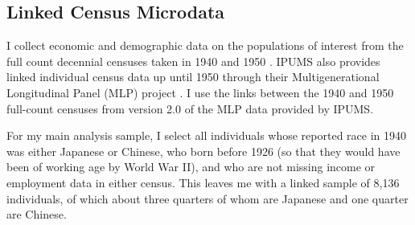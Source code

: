 \documentclass[12pt]{article}
\begin{document}
\subsection{Linked Census Microdata}
\label{sec:orga466988}

I collect economic and demographic data on the populations of interest
from the full count decennial censuses taken in 1940 and 1950
\citep{rugglesIPUMSAncestryFull2024}.
IPUMS also provides linked individual census data up until 1950
through their Multigenerational Longitudinal Panel (MLP) project
\citep{rugglesIPUMSMultigenerationalLongitudinal2025}.
I use the links between the 1940 and 1950 full-count censuses
from version 2.0 of the MLP data provided by IPUMS.

For my main analysis sample,
I select all individuals
whose reported race in 1940 was either Japanese or Chinese,
who born before 1926 (so that they would have been of working age by World War II),
and who are not missing income or employment data in either census.
This leaves me with a linked sample of 8,136 individuals,
of which about three quarters of whom are Japanese
and one quarter are Chinese.
\end{document}
